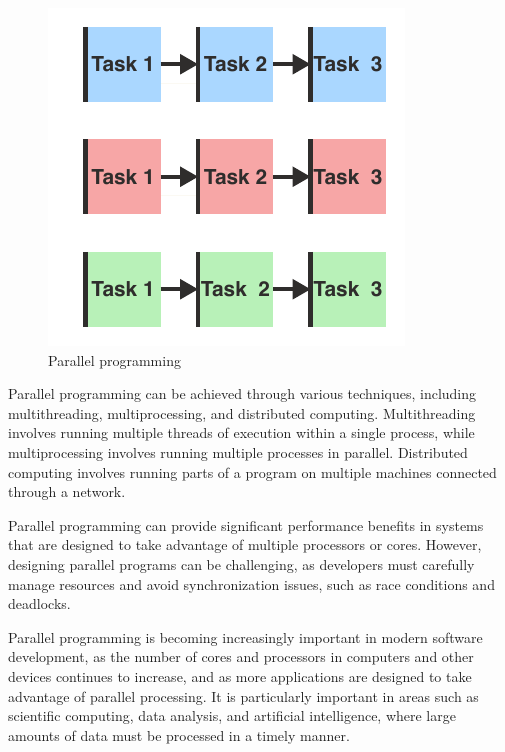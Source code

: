 \begin{figure}[H]
    \centering
    \includegraphics[width=.33\textwidth]{figures/concurrency/paralell.pdf}
    \caption{Parallel programming}
    \label{fig:concurrency_parallel}
\end{figure}

Parallel programming can be achieved through various techniques, including multithreading, multiprocessing, and distributed computing.
Multithreading involves running multiple threads of execution within a single process, while multiprocessing involves running multiple processes in parallel.
Distributed computing involves running parts of a program on multiple machines connected through a network.

Parallel programming can provide significant performance benefits in systems that are designed to take advantage of multiple processors or cores.
However, designing parallel programs can be challenging, as developers must carefully manage resources and avoid synchronization issues, such as race conditions and deadlocks.

Parallel programming is becoming increasingly important in modern software development, as the number of cores and processors in computers and other devices continues to increase, and as more applications are designed to take advantage of parallel processing.
It is particularly important in areas such as scientific computing, data analysis, and artificial intelligence, where large amounts of data must be processed in a timely manner.


